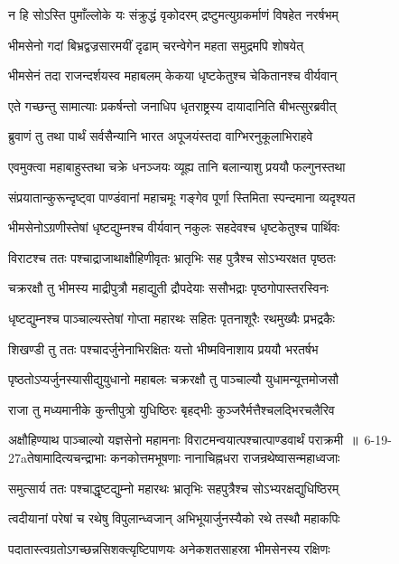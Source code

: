 \twolineshloka
{न हि सोऽस्ति पुमाँल्लोके यः संक्रुद्धं वृकोदरम्}
{द्रष्टुमत्युग्रकर्माणं विषहेत नरर्षभम्}


\twolineshloka
{भीमसेनो गदां बिभ्रद्वज्रसारमयीं दृढाम्}
{चरन्वेगेन महता समुद्रमपि शोषयेत्}


\twolineshloka
{भीमसेनं तदा राजन्दर्शयस्व महाबलम्}
{केकया धृष्टकेतुश्च चेकितानश्च वीर्यवान्}


\twolineshloka
{एते गच्छन्तु सामात्याः प्रकर्षन्तो जनाधिप}
{धृतराष्ट्रस्य दायादानिति बीभत्सुरब्रवीत्}


\twolineshloka
{ब्रुवाणं तु तथा पार्थं सर्वसैन्यानि भारत}
{अपूजयंस्तदा वाग्भिरनुकूलाभिराहवे}


\twolineshloka
{एवमुक्त्वा महाबाहुस्तथा चक्रे धनञ्जयः}
{व्यूह्य तानि बलान्याशु प्रययौ फल्गुनस्तथा}


\twolineshloka
{संप्रयातान्कुरून्दृष्ट्वा पाण्डंवानां महाचमूः}
{गङ्गेव पूर्णा स्तिमिता स्पन्दमाना व्यदृश्यत}


\twolineshloka
{भीमसेनोऽग्रणीस्तेषां धृष्टद्युम्नश्च वीर्यवान्}
{नकुलः सहदेवश्च धृष्टकेतुश्च पार्थिवः}


\twolineshloka
{विराटश्च ततः पश्चाद्राजाथाक्षौहिणीवृतः}
{भ्रातृभिः सह पुत्रैश्च सोऽभ्यरक्षत पृष्ठतः}


\twolineshloka
{चक्ररक्षौ तु भीमस्य माद्रीपुत्रौ महाद्युती}
{द्रौपदेयाः ससौभद्राः पृष्ठगोपास्तरस्विनः}


\twolineshloka
{धृष्टद्युम्नश्च पाञ्चाल्यस्तेषां गोप्ता महारथः}
{सहितः पृतनाशूरैः रथमुख्यैः प्रभद्रकैः}


\twolineshloka
{शिखण्डी तु ततः पश्चादर्जुनेनाभिरक्षितः}
{यत्तो भीष्मविनाशाय प्रययौ भरतर्षभ}


\twolineshloka
{पृष्ठतोऽप्यर्जुनस्यासीद्युयुधानो महाबलः}
{चक्ररक्षौ तु पाञ्चाल्यौ युधामन्यूत्तमोजसौ}


\twolineshloka
{राजा तु मध्यमानीके कुन्तीपुत्रो युधिष्ठिरः}
{बृहद्भीः कुञ्जरैर्मत्तैश्चलद्भिरचलैरिव}


\threelineshloka
{अक्षौहिण्याथ पाञ्चाल्यो यज्ञसेनो महामनाः}
{विराटमन्वयात्पश्चात्पाण्डवार्थं पराक्रमी ॥ 6-19-27aतेषामादित्यचन्द्राभाः कनकोत्तमभूषणाः}
{नानाचिह्नधरा राजन्रथेष्वासन्महाध्वजाः}


\twolineshloka
{समुत्सार्य ततः पश्चाद्धृष्टद्युम्नो महारथः}
{भ्रातृभिः सहपुत्रैश्च सोऽभ्यरक्षद्युधिष्ठिरम्}


\twolineshloka
{त्वदीयानां परेषां च रथेषु विपुलान्ध्वजान्}
{अभिभूयार्जुनस्यैको रथे तस्थौ महाकपिः}


\twolineshloka
{पदातास्त्वग्रतोऽगच्छन्नसिशक्त्यृष्टिपाणयः}
{अनेकशतसाहस्रा भीमसेनस्य रक्षिणः}


